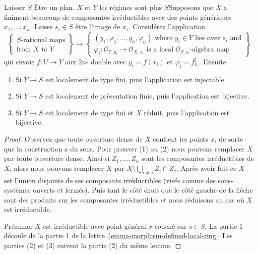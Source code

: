 \begin{lemma}

\label{lemma-rational-map-finite-presentation}

Laisser $S$ Être un plan. $X$ et $Y$ les régimes sont plus $S$Supposons que $X$ a finiment beaucoup de composantes irréductibles avec des points génériques
$x_1, \ldots, x_n$. Laisse $s_i \in S$ être l'image de $x_i$. Considérez l'application
$$
\left\{
\begin{matrix}
S\text{-rational maps} \\
\text{from }X\text{ to }Y
\end{matrix}
\right\}
\longrightarrow
\left\{
\begin{matrix}
(y_1, \varphi_1, \ldots, y_n, \varphi_n)\text{ where }
y_i \in Y\text{ lies over }s_i\text{ and}\\
\varphi_i : \mathcal{O}_{Y, y_i} \to \mathcal{O}_{X, x_i}
\text{ is a local }\mathcal{O}_{S, s_i}\text{-algebra map}
\end{matrix}
\right\}
$$
qui envoie $f : U \to Y$ aux $2n$- double avec
$y_i = f(x_i)$ et $\varphi_i = f^\sharp_{x_i}$. Ensuite

\begin{enumerate}

\item Si $Y \to S$ est localement de type fini, puis l'application est injectable.
\item Si $Y \to S$ est localement de présentation finie, puis l'application est bijective.
\item Si $Y \to S$ est localement de type fini et $X$ réduit, puis l'application est bijective.

\end{enumerate}

\end{lemma}

\begin{proof}
Observez que toute ouverture dense de $X$ contient les points $x_i$ de sorte que la construction a du sens. Pour prouver (1) ou (2) nous pouvons remplacer $X$ par toute ouverture dense. Ainsi si $Z_1, \ldots, Z_n$ sont les composantes irréductibles de $X$, alors nous pouvons remplacer $X$ par $X \setminus \bigcup_{i \not = j} Z_i \cap Z_j$. Après avoir fait ce $X$ est l'union disjointe de ses composants irréductibles (visés comme des sous-systèmes ouverts et fermés). Puis tant le côté droit que le côté gauche de la flèche sont des produits sur les composantes irréductibles et nous réduisons au cas où $X$ est irréductible.

\medskip\noindent

Présumer $X$ est irréductible avec point général $x$ couché sur $s \in S$. La partie 1 découle de la partie 1 de la lettre \ref{lemma-morphism-defined-local-ring}. Les parties (2) et (3) suivent la partie (2) du même lemme.

\end{proof}

